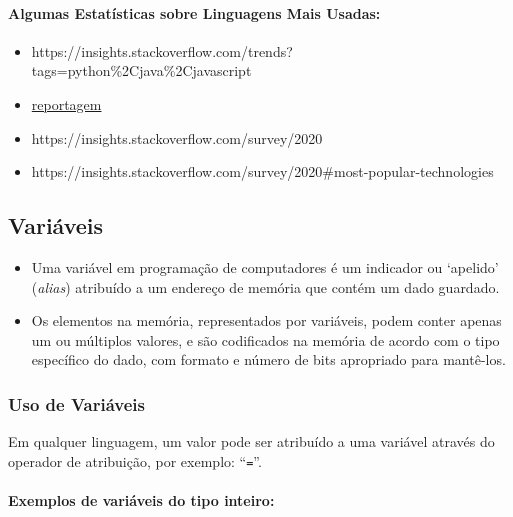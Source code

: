 \documentclass[12pt,a4paper]{article}
\providecommand{\tightlist}{%
      \setlength{\itemsep}{0pt}\setlength{\parskip}{0pt}}
\begin{document}
    \hypertarget{algumas-estatuxedsticas-sobre-linguagens-mais-usadas}{%
\paragraph{Algumas Estatísticas sobre Linguagens Mais
Usadas:}\label{algumas-estatuxedsticas-sobre-linguagens-mais-usadas}}

\begin{itemize}
\tightlist
\item
  https://insights.stackoverflow.com/trends?tags=python\%2Cjava\%2Cjavascript\\
\item
  \href{https://profdanielbrandao.wordpress.com/2019/03/01/o-incrivel-crescimento-da-linguagem-python/}{reportagem}
\item
  https://insights.stackoverflow.com/survey/2020
\item
  https://insights.stackoverflow.com/survey/2020\#most-popular-technologies
\end{itemize}

    \hypertarget{variuxe1veis}{%
\subsection{Variáveis}\label{variuxe1veis}}

    \begin{itemize}
\tightlist
\item
  Uma variável em programação de computadores é um indicador ou
  `apelido' (\emph{alias}) atribuído a um endereço de memória que contém
  um dado guardado.
\item
  Os elementos na memória, representados por variáveis, podem conter
  apenas um ou múltiplos valores, e são codificados na memória de acordo
  com o tipo específico do dado, com formato e número de bits apropriado
  para mantê-los.
\end{itemize}

    \hypertarget{uso-de-variuxe1veis}{%
\subsubsection{Uso de Variáveis}\label{uso-de-variuxe1veis}}

    Em qualquer linguagem, um valor pode ser atribuído a uma variável
através do operador de atribuição, por exemplo: ``\texttt{=}''.

    \hypertarget{exemplos-de-variuxe1veis-do-tipo-inteiro}{%
\paragraph{Exemplos de variáveis do tipo
inteiro:}\label{exemplos-de-variuxe1veis-do-tipo-inteiro}}
\end{document}
